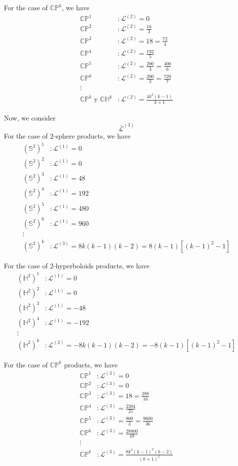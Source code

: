 For the case of $\mathbb{CP}^k$, we have
\begin{align}
  \mathbb{CP}^1&:\mathcal{L}^{(2)}=0\\
  \mathbb{CP}^2&:\mathcal{L}^{(2)}=\frac{16}{3}\\
  \mathbb{CP}^3&:\mathcal{L}^{(2)}=18=\frac{72}{4}\\
  \mathbb{CP}^4&:\mathcal{L}^{(2)}=\frac{192}{5}\\
  \mathbb{CP}^5&:\mathcal{L}^{(2)}=\frac{200}{3}=\frac{400}{6}\\
  \mathbb{CP}^6&:\mathcal{L}^{(2)}=\frac{200}{3}=\frac{720}{7}\\
  \vdots\\
  \mathbb{CP}^k \text{ y } \mathbb{CH}^k&:\mathcal{L}^{(2)}=\frac{4k^2(k-1)}{k+1}
\end{align}


Now, we consider $$\bar{\mathcal{L}}^{(3)}$$
For the case of $2$-sphere products, we have
\begin{align}
  (\mathbb{S}^2)^1&:\mathcal{L}^{(1)}=0\\
  (\mathbb{S}^2)^2&:\mathcal{L}^{(1)}=0\\
  (\mathbb{S}^2)^3&:\mathcal{L}^{(1)}=48\\
  (\mathbb{S}^2)^4&:\mathcal{L}^{(1)}=192\\
  (\mathbb{S}^2)^5&:\mathcal{L}^{(1)}=480\\
  (\mathbb{S}^2)^6&:\mathcal{L}^{(1)}=960\\
  \vdots\\
  (\mathbb{S}^2)^k&:\mathcal{L}^{(3)}=8k(k-1)(k-2)=8(k-1)[(k-1)^2-1]
\end{align}

For the case of $2$-hyperboloids products, we have
\begin{align}
  (\mathbb{H}^2)^1&:\mathcal{L}^{(1)}=0\\
  (\mathbb{H}^2)^2&:\mathcal{L}^{(1)}=0\\
  (\mathbb{H}^2)^3&:\mathcal{L}^{(1)}=-48\\
  (\mathbb{H}^2)^4&:\mathcal{L}^{(1)}=-192\\
  \vdots\\
  (\mathbb{H}^2)^k&:\mathcal{L}^{(3)}=-8k(k-1)(k-2)=-8(k-1)[(k-1)^2-1]
\end{align}

For the case of $\mathbb{CP}^k$ products, we have
\begin{align}
  \mathbb{CP}^1&:\mathcal{L}^{(3)}=0\\
\mathbb{CP}^2&:\mathcal{L}^{(3)}=0\\
\mathbb{CP}^3&:\mathcal{L}^{(3)}=18=\frac{288}{16}\\
\mathbb{CP}^4&:\mathcal{L}^{(3)}=\frac{2304}{25}\\
\mathbb{CP}^5&:\mathcal{L}^{(3)}=\frac{800}{3}=\frac{9600}{36}\\
\mathbb{CP}^6&:\mathcal{L}^{(3)}=\frac{28800}{49}\\
  \vdots\\
  \mathbb{CP}^k&:\mathcal{L}^{(3)}=\frac{8k^2(k-1)^2(k-2)}{(k+1)^2}
\end{align}

